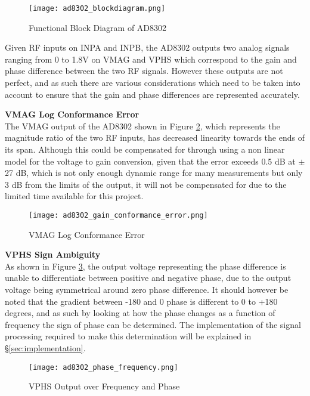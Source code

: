 \begin{figure}[H]
	\centering
	\texttt{[image: ad8302\_blockdiagram.png]}
	\caption{Functional Block Diagram of AD8302}
	\label{fig:ad8302_block_diag}
\end{figure}

Given RF inputs on INPA and INPB, the AD8302 outputs two analog signals ranging from 0 to 1.8V on VMAG and VPHS which correspond to the gain and phase difference between the two RF signals. However these outputs are not perfect, and as such there are various considerations which need to be taken into account to ensure that the gain and phase differences are represented accurately. 

\textbf{VMAG Log Conformance Error} \\
The VMAG output of the AD8302 shown in Figure \ref{fig:ad8302_VMAG_conformance}, which represents the magnitude ratio of the two RF inputs, has decreased linearity towards the ends of its span. Although this could be compensated for through using a non linear model for the voltage to gain conversion, given that the error exceeds 0.5 dB at $\pm$27 dB, which is not only enough dynamic range for many measurements but only 3 dB from the limits of the output, it will not be compensated for due to the limited time available for this project.  
\begin{figure}[H]
	\centering
	\texttt{[image: ad8302\_gain\_conformance\_error.png]}
	\caption{VMAG Log Conformance Error}
	\label{fig:ad8302_VMAG_conformance}
\end{figure}

\textbf{VPHS Sign Ambiguity} \\
As shown in Figure \ref{fig:ad8302_VPHS_frequency}, the output voltage representing the phase difference is unable to differentiate between positive and negative phase, due to the output voltage being symmetrical around zero phase difference. It should however be noted that the gradient between -180 and 0 phase is different to 0 to +180 degrees, and as such by looking at how the phase changes as a function of frequency the sign of phase can be determined. The implementation of the signal processing required to make this determination will be explained in \S \ref{sec:implementation}. 
\begin{figure}[H]
	\centering
	\texttt{[image: ad8302\_phase\_frequency.png]}
	\caption{VPHS Output over Frequency and Phase}
	\label{fig:ad8302_VPHS_frequency}
\end{figure}

